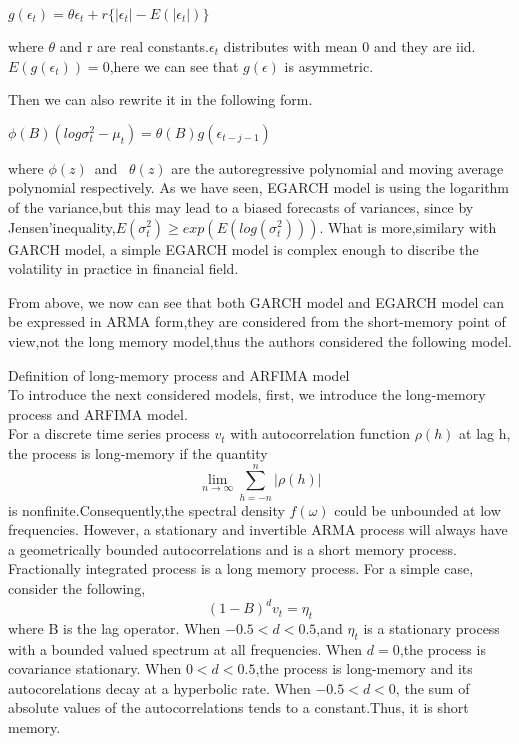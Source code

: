 \documentclass[10pt,a4paper]{article}
\begin{document}
\begin{center}$\displaystyle g(\epsilon_t)=\theta\epsilon_t+r\{|\epsilon_t|-E(|\epsilon_t|)\}$\end{center} where $\theta$ and r are real constants.$\epsilon_t$ distributes with mean 0 and they are iid.$E(g(\epsilon_t))=0$,here we can see that $g(\epsilon)$ is asymmetric. 

Then we can also rewrite it in the following form.

\begin{center}$\displaystyle \phi(B)(log\sigma^2_t-\mu_t)=\theta(B)g(\epsilon_{t-j-1})$\end{center}

where $\phi(z)$\ and \ $\theta(z)$ are the autoregressive polynomial  and moving average polynomial respectively. As we have seen, EGARCH model is using the logarithm of the variance,but this may lead to a biased forecasts of variances, since by Jensen'inequality,$E(\sigma^2_t)\geq exp(E(log(\sigma^2_t)))$. What is more,similary with GARCH model, a simple EGARCH model is complex enough to discribe the volatility in practice in financial field.





From above, we now can see that both GARCH model and EGARCH model can be expressed in ARMA form,they are considered from the short-memory point of view,not the long memory model,thus the authors considered the following model.


Definition of long-memory process and ARFIMA model\\
  
  To introduce the next considered models, first, we introduce the long-memory process and ARFIMA model.\\
  
  For a discrete time series process $v_t$ with autocorrelation function $\rho (h)$ at lag h, the process is long-memory if the quantity
$$\lim\limits_{n\rightarrow\infty} \sum_{h=-n}^{n}|\rho(h)|$$
is nonfinite.Consequently,the spectral density $f(\omega)$ could be unbounded at low frequencies. However, a stationary and invertible ARMA process will always have a geometrically bounded autocorrelations and is a short memory process. Fractionally integrated process is a long memory process. For a simple case, consider the following,
$$(1-B)^dv_t=\eta_t$$
where B is the lag operator. When $-0.5<d<0.5$,and $\eta_t$ is a stationary process with a bounded valued spectrum at all frequencies. When $d=0$,the process is covariance stationary. When $0<d<0.5$,the process is long-memory and its autocorelations decay at a hyperbolic rate. When $-0.5<d<0$, the sum of absolute values of the autocorrelations tends to a constant.Thus, it is short memory.\\
\end{document}

